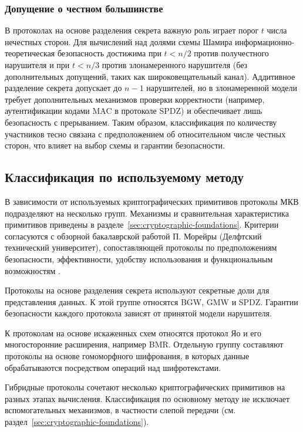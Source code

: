 \subsubsection{Допущение о честном большинстве}
В протоколах на основе разделения секрета важную роль играет порог \(t\) числа нечестных сторон.  Для вычислений над долями схемы Шамира информационно-\allowbreak теоретическая безопасность достижима при \(t<n/2\) против получестного нарушителя и при \(t<n/3\) против злонамеренного нарушителя (без дополнительных допущений, таких как широковещательный канал).  Аддитивное разделение секрета допускает до \(n-1\) нарушителей, но в злонамеренной модели требует дополнительных механизмов проверки корректности (например, аутентификации кодами MAC в протоколе SPDZ) и обеспечивает лишь безопасность с прерыванием.  Таким образом, классификация по количеству участников тесно связана с предположением об относительном числе честных сторон, что влияет на выбор схемы и гарантии безопасности.

\subsection{Классификация по используемому методу}
\label{subsec:classification-primitives}

В зависимости от используемых криптографических примитивов протоколы МКВ подразделяют на несколько групп. Механизмы и сравнительная характеристика примитивов приведены в разделе~\ref{sec:cryptographic-foundations}. Критерии согласуются с обзорной бакалаврской работой П. Морейры (Делфтский технический университет), сопоставляющей протоколы по предположениям безопасности, эффективности, удобству использования и функциональным возможностям \cite{10}.

Протоколы на основе разделения секрета используют секретные доли для представления данных. К этой группе относятся BGW, GMW и SPDZ. Гарантии безопасности каждого протокола зависят от принятой модели нарушителя.

К протоколам на основе искаженных схем относятся протокол Яо и его многосторонние расширения, например BMR. Отдельную группу составляют протоколы на основе гомоморфного шифрования, в которых данные обрабатываются посредством операций над шифротекстами.

Гибридные протоколы сочетают несколько криптографических примитивов на разных этапах вычисления. Классификация по основному методу не исключает вспомогательных механизмов, в частности слепой передачи (см. раздел~\ref{sec:cryptographic-foundations}).

